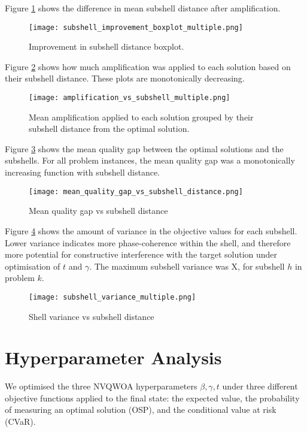 Figure \ref{fig:sub improvement} shows the difference in mean subshell distance after amplification.
\begin{figure}[htbp]
    \centering
    \texttt{[image: subshell\_improvement\_boxplot\_multiple.png]}
    \caption{Improvement in subshell distance boxplot.}
    \label{fig:sub improvement}
\end{figure}

Figure \ref{fig:amp vs sub} shows how much amplification was applied to each solution based on their subshell distance. These plots are monotonically decreasing. 
\begin{figure}[htbp]
    \centering
    \texttt{[image: amplification\_vs\_subshell\_multiple.png]}
    \caption{Mean amplification applied to each solution grouped by their subshell distance from the optimal solution.}
    \label{fig:amp vs sub}
\end{figure}

Figure \ref{fig:mqg} shows the mean quality gap between the optimal solutions and the subshells. For all problem instances, the mean quality gap was a monotonically increasing function with subshell distance.
\begin{figure}[htbp]
    \centering
    \texttt{[image: mean\_quality\_gap\_vs\_subshell\_distance.png]}
    \caption{Mean quality gap vs subshell distance}
    \label{fig:mqg}
\end{figure}

Figure \ref{fig:shell variance} shows the amount of variance in the objective values for each subshell.
Lower variance indicates more phase-coherence within the shell, and therefore more potential for constructive interference with the target solution under optimisation of $t$ and $\gamma$. The maximum subshell variance was X, for subshell $h$ in problem $k$.
\begin{figure}[htbp]
    \centering
    \texttt{[image: subshell\_variance\_multiple.png]}
    \caption{Shell variance vs subshell distance}
    \label{fig:shell variance}
\end{figure}

\section{Hyperparameter Analysis}
We optimised the three NVQWOA hyperparameters $\beta, \gamma, t$ under three different objective functions applied to the final state: the expected value, the probability of measuring an optimal solution (OSP), and the conditional value at risk (CVaR).

